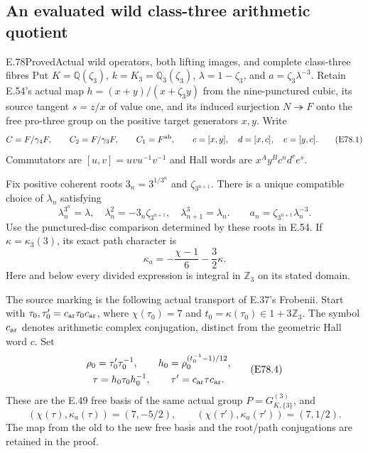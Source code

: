 \subsection{An evaluated wild class-three arithmetic quotient}

\begin{statement}{E.78}{Proved}{Actual wild operators, both lifting images, and complete class-three fibres}
Put $K=\mathbb Q(\zeta_3)$, $k=K_3=\mathbb Q_3(\zeta_3)$,
$\lambda=1-\zeta_3$, and $a=\zeta_3\lambda^{-3}$.
Retain E.54's actual map
$h=(x+y)/(x+\zeta_3y)$ from the nine-punctured cubic,
its source tangent $s=z/x$ of value one, and its induced
surjection $N\twoheadrightarrow F$ onto the free pro-three
group on the positive target generators $x,y$.
Write
\[
 C=F/\gamma_4F,\qquad C_2=F/\gamma_3F,\qquad
 C_1=F^{\rm ab},\qquad
 c=[x,y],\quad d=[x,c],\quad e=[y,c].
 \tag{E78.1}
\]
Commutators are $[u,v]=uvu^{-1}v^{-1}$ and Hall words are
$x^A y^B c^n d^r e^s$.

Fix positive coherent roots $3_n=3^{1/3^n}$ and
$\zeta_{3^{n+1}}$. There is a unique compatible choice
of $\lambda_n$ satisfying
\[
 \lambda_n^{3^n}=\lambda,\quad
 \lambda_n^2=-3_n\zeta_{3^{n+1}},\quad
 \lambda_{n+1}^3=\lambda_n.
 \qquad
 a_n=\zeta_{3^{n+1}}\lambda_n^{-3}.
 \tag{E78.2}
\]
Use the punctured-disc comparison determined by these
roots in E.54. If $\kappa=\kappa_3(3)$, its exact path
character is
\[
 \kappa_a=-\frac{\chi-1}{6}-\frac32\kappa.
 \tag{E78.3}
\]
Here and below every divided expression is integral in
$\mathbb Z_3$ on its stated domain.

The source marking is the following actual transport
of E.37's Frobenii. Start with
$\tau_0,\tau'_0=c_{\rm ar}\tau_0c_{\rm ar}$,
where $\chi(\tau_0)=7$ and
$t_0=\kappa(\tau_0)\in1+3\mathbb Z_3$.
The symbol $c_{\rm ar}$ denotes arithmetic complex
conjugation, distinct from the geometric Hall word $c$.
Set
\[
 \begin{gathered}
 \rho_0=\tau'_0\tau_0^{-1},\qquad
 h_0=\rho_0^{(t_0^{-1}-1)/12},\\
 \tau=h_0\tau_0h_0^{-1},\qquad
 \tau'=c_{\rm ar}\tau c_{\rm ar}.
 \end{gathered}
 \tag{E78.4}
\]
These are the E.49 free basis of the same actual group
$P=G_{K,\{3\}}^{(3)}$, and
\[
 (\chi(\tau),\kappa_a(\tau))=(7,-5/2),
 \qquad
 (\chi(\tau'),\kappa_a(\tau'))=(7,1/2).
 \tag{E78.5}
\]
The map from the old to the new free basis and the
root/path conjugations are retained in the proof.


\end{statement}
